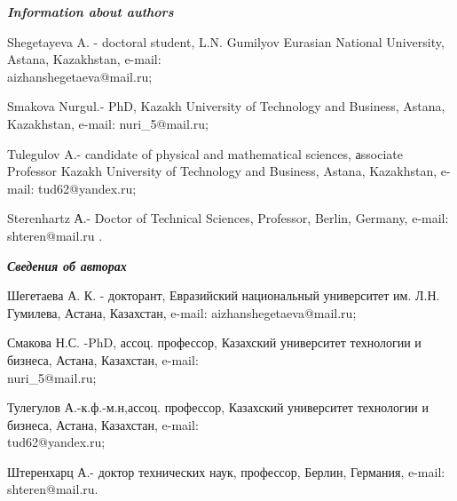 \begin{authorinfo}
\hspace{1em}\emph{{\bfseries Information about authors}}

Shegetayeva A. - doctoral student, L.N. Gumilyov Eurasian National
University, Astana, Kazakhstan, e-mail:\\
aizhanshegetaeva@mail.ru;

Smakova Nurgul.- PhD, Kazakh University of Technology and Business,
Astana, Kazakhstan, e-mail:
nuri\_5@mail.ru;

Tulegulov A.- candidate of physical and mathematical sciences, аssociate
Professor Kazakh University of Technology and Business, Astana,
Kazakhstan, e-mail:
tud62@yandex.ru;

Sterenhartz А.- Doctor of Technical Sciences, Professor, Berlin,
Germany, e-mail: shteren@mail.ru .

\hspace{1em}\emph{{\bfseries Сведения об авторах}}

Шегетаева А. К. - докторант, Евразийский национальный университет им.
Л.Н. Гумилева, Астана, Казахстан, e-mail:
aizhanshegetaeva@mail.ru;

Смакова Н.С. -PhD, ассоц. профессор, Казахский университет технологии и
бизнеса, Астана, Казахстан, e-mail:\\
nuri\_5@mail.ru;

Тулегулов А.-к.ф.-м.н,ассоц. профессор, Казахский университет технологии
и бизнеса, Астана, Казахстан, e-mail:\\
tud62@yandex.ru;

Штеренхарц А.- доктор технических наук, профессор, Берлин, Германия,
e-mail: shteren@mail.ru.
\end{authorinfo}
